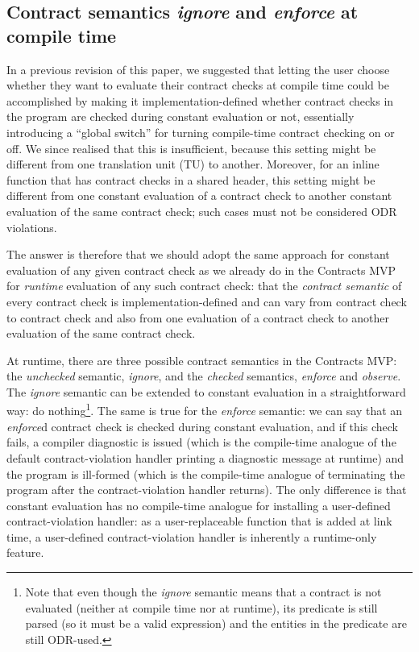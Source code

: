 \subsection{Contract semantics \emph{ignore} and \emph{enforce} at compile time}

In a previous revision of this paper, we suggested that letting the user choose whether they want to evaluate their contract checks at compile time could be accomplished by making it implementation-defined whether contract checks in the program are checked during constant evaluation or not, essentially introducing a ``global switch'' for turning compile-time contract checking on or off. We since realised that this is insufficient, because this setting might be different from one translation unit (TU) to another. Moreover, for an inline function that has contract checks in a shared header, this setting might be different from one constant evaluation of a contract check to another constant evaluation of the same contract check; such cases must not be considered ODR violations.

The answer is therefore that we should adopt the same approach for constant evaluation of any given contract check as we already do in the Contracts MVP \cite{P2900R1} for \emph{runtime} evaluation of any such contract check: that the \emph{contract semantic} of every contract check is implementation-defined and can vary from contract check to contract check and also from one evaluation of a contract check to another evaluation of the same contract check.

At runtime, there are three possible contract semantics in the Contracts MVP: the \emph{unchecked} semantic, \emph{ignore}, and the \emph{checked} semantics, \emph{enforce} and \emph{observe}. The \emph{ignore} semantic can be extended to constant evaluation in a straightforward way: do nothing\footnote{Note that even though the \emph{ignore} semantic means that a contract is not evaluated (neither at compile time nor at runtime), its predicate is still parsed (so it must be a valid expression) and the entities in the predicate are still ODR-used.}. The same is true for the \emph{enforce} semantic:  we can say that an \emph{enforce}d contract check is checked during constant evaluation, and if this check fails, a compiler diagnostic is issued (which is the compile-time analogue of the default contract-violation handler printing a diagnostic message at runtime) and the program is ill-formed (which is the compile-time analogue of terminating the program after the contract-violation handler returns). The only difference is that constant evaluation has no compile-time analogue for installing a user-defined contract-violation handler: as a user-replaceable function that is added at link time, a user-defined contract-violation handler is inherently a runtime-only feature.

